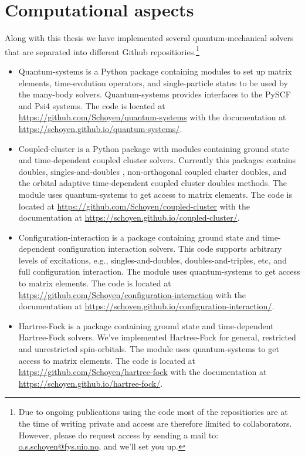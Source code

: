 \chapter{Computational aspects}
    Along with this thesis we have implemented several quantum-mechanical
    solvers that are separated into different Github repositiories.\footnote{%
        Due to ongoing publications using the code most of the repositiories are
        at the time of writing private and access are therefore limited to
        collaborators.
        However, please do request access by sending a mail to:
        \href{mailto:o.s.schoyen@fys.uio.no}{o.s.schoyen@fys.uio.no}, and we'll
        set you up.
    }
    \begin{itemize}
        \item Quantum-systems is a Python package containing modules to set up
            matrix elements, time-evolution operators, and single-particle
            states to be used by the many-body solvers.
            Quantum-systems provides interfaces to the PySCF \cite{pyscf} and
            Psi4 \cite{psi4} systems.
            The code is located at
            \url{https://github.com/Schoyen/quantum-systems} with the
            documentation at
            \url{https://schoyen.github.io/quantum-systems/}.
        \item Coupled-cluster is a Python package with modules containing ground
            state and time-dependent coupled cluster solvers.
            Currently this packages contains doubles, singles-and-doubles ,
            non-orthogonal coupled cluster doubles, and the orbital adaptive
            time-dependent coupled cluster doubles methods.
            The module uses quantum-systems to get access to matrix elements.
            The code is located at
            \url{https://github.com/Schoyen/coupled-cluster} with the
            documentation at
            \url{https://schoyen.github.io/coupled-cluster/}.
        \item Configuration-interaction is a package containing ground state and
            time-dependent configuration interaction solvers.
            This code supports arbitrary levels of excitations, e.g.,
            singles-and-doubles, doubles-and-triples, etc, and full
            configuration interaction.
            The module uses quantum-systems to get access to matrix elements.
            The code is located at
            \url{https://github.com/Schoyen/configuration-interaction} with
            the documentation at
            \url{https://schoyen.github.io/configuration-interaction/}.
        \item Hartree-Fock is a package containing ground state and
            time-dependent Hartree-Fock solvers.
            We've implemented Hartree-Fock for general, restricted and
            unrestricted spin-orbitals.
            The module uses quantum-systems to get access to matrix elements.
            The code is located at
            \url{https://github.com/Schoyen/hartree-fock} with
            the documentation at
            \url{https://schoyen.github.io/hartree-fock/}.
    \end{itemize}
